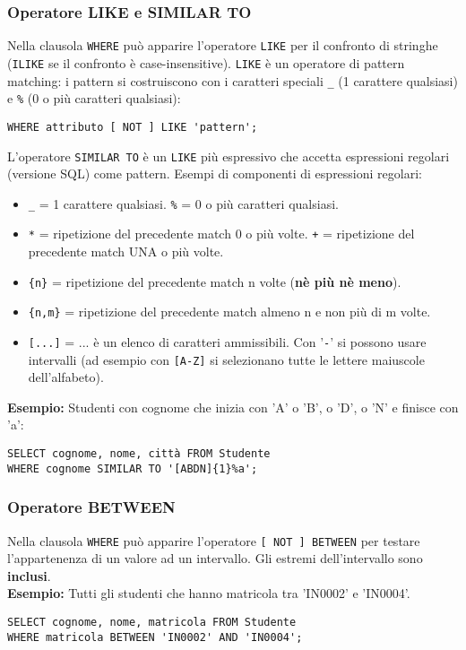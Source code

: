 \documentclass[a4paper, 10pt, titlepage]{article}
\begin{document}
	\subsubsection{Operatore LIKE e SIMILAR TO}
		Nella clausola \lstinline|WHERE| può apparire l’operatore \lstinline|LIKE| per il confronto di
		stringhe (\lstinline|ILIKE| se il confronto è case-insensitive). \lstinline|LIKE| è un operatore di pattern matching: i pattern si costruiscono con i caratteri speciali \lstinline|_| (1 carattere qualsiasi) e \lstinline|%| (0 o più caratteri qualsiasi):
		\begin{lstlisting}
WHERE attributo [ NOT ] LIKE 'pattern';
		\end{lstlisting}
		L’operatore \lstinline|SIMILAR TO| è un \lstinline|LIKE| più espressivo che accetta
		espressioni regolari (versione SQL) come pattern. Esempi di componenti di
		espressioni regolari:
		\begin{itemize}
			\item \lstinline|_| = 1 carattere qualsiasi. \lstinline|%| = 0 o più caratteri qualsiasi.
			\item \lstinline|*| = ripetizione del precedente match 0 o più volte. 
				\lstinline|+| = ripetizione del precedente match UNA o più volte.
			\item \lstinline|{n}| = ripetizione del precedente match n volte (\textbf{nè più nè meno}).
			\item \lstinline|{n,m}| = ripetizione del precedente match almeno n e non più di m volte.
			\item \lstinline|[...]| = ... è un elenco di caratteri ammissibili. Con '\lstinline|-|' si possono usare intervalli (ad esempio con \lstinline|[A-Z]| si selezionano tutte le lettere maiuscole dell'alfabeto).
		\end{itemize}
		\textbf{Esempio:} Studenti con cognome che inizia con 'A' o 'B', o 'D', o 'N' e finisce con 'a':
		\begin{lstlisting}
SELECT cognome, nome, città FROM Studente
WHERE cognome SIMILAR TO '[ABDN]{1}%a';
		\end{lstlisting}
		
	\subsubsection{Operatore BETWEEN}
		Nella clausola \lstinline|WHERE| può apparire l’operatore \lstinline|[ NOT ] BETWEEN| per testare
		l’appartenenza di un valore ad un intervallo. Gli estremi dell'intervallo sono \textbf{inclusi}.\medskip \\
		\textbf{Esempio:} Tutti gli studenti che hanno matricola tra 'IN0002' e 'IN0004'.
	\begin{lstlisting}
SELECT cognome, nome, matricola FROM Studente
WHERE matricola BETWEEN 'IN0002' AND 'IN0004';
	\end{lstlisting}
	
\end{document}
